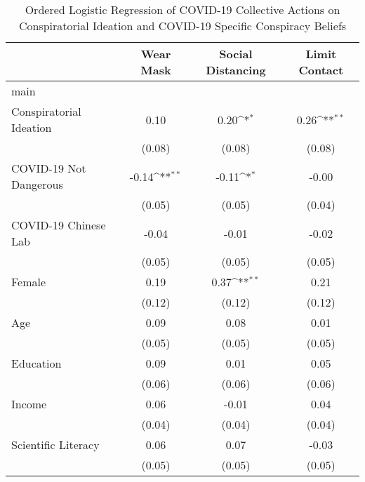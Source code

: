 \begin{table}[htbp]\centering
\def\sym#1{\ifmmode^{#1}\else\(^{#1}\)\fi}
\caption{Ordered Logistic Regression of COVID-19 Collective Actions on Conspiratorial Ideation and COVID-19 Specific Conspiracy Beliefs}
\begin{tabular}{l*{3}{c}}
\hline\hline
                    &\multicolumn{1}{c}{Wear Mask}&\multicolumn{1}{c}{Social Distancing}&\multicolumn{1}{c}{Limit Contact}\\
\hline
main                &                    &                    &                    \\
Conspiratorial Ideation&        0.10        &        0.20\sym{*} &        0.26\sym{**}\\
                    &      (0.08)        &      (0.08)        &      (0.08)        \\
[1em]
COVID-19 Not Dangerous&       -0.14\sym{**}&       -0.11\sym{*} &       -0.00        \\
                    &      (0.05)        &      (0.05)        &      (0.04)        \\
[1em]
COVID-19 Chinese Lab&       -0.04        &       -0.01        &       -0.02        \\
                    &      (0.05)        &      (0.05)        &      (0.05)        \\
[1em]
Female              &        0.19        &        0.37\sym{**}&        0.21        \\
                    &      (0.12)        &      (0.12)        &      (0.12)        \\
[1em]
Age                 &        0.09        &        0.08        &        0.01        \\
                    &      (0.05)        &      (0.05)        &      (0.05)        \\
[1em]
Education           &        0.09        &        0.01        &        0.05        \\
                    &      (0.06)        &      (0.06)        &      (0.06)        \\
[1em]
Income              &        0.06        &       -0.01        &        0.04        \\
                    &      (0.04)        &      (0.04)        &      (0.04)        \\
[1em]
Scientific Literacy &        0.06        &        0.07        &       -0.03        \\
                    &      (0.05)        &      (0.05)        &      (0.05)        \\

\end{tabular}
\end{table}
